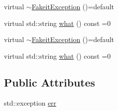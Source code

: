 \begin{DoxyCompactItemize}
\item 
virtual \mbox{\hyperlink{structfakeit_1_1FakeitException_a80baf49dc322fe156c4291ec40809d9c}{$\sim$\+Fakeit\+Exception}} ()=default
\item 
virtual std\+::string \mbox{\hyperlink{structfakeit_1_1FakeitException_a02ef6315b98e4382157c2106a62f7718}{what}} () const =0
\item 
virtual \mbox{\hyperlink{structfakeit_1_1FakeitException_a80baf49dc322fe156c4291ec40809d9c}{$\sim$\+Fakeit\+Exception}} ()=default
\item 
virtual std\+::string \mbox{\hyperlink{structfakeit_1_1FakeitException_a02ef6315b98e4382157c2106a62f7718}{what}} () const =0
\end{DoxyCompactItemize}
\subsection*{Public Attributes}
\begin{DoxyCompactItemize}
\item 
std\+::exception \mbox{\hyperlink{structfakeit_1_1FakeitException_a187acc5323edb9d34e28fa51fe2fb35c}{err}}
\end{DoxyCompactItemize}
